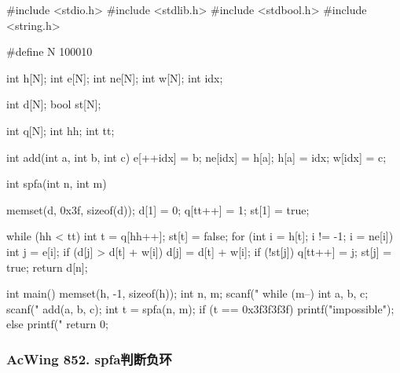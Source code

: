 \begin{mycpptwocol}[SPFA]
    #include <stdio.h>
    #include <stdlib.h>
    #include <stdbool.h>
    #include <string.h>

    #define N 100010

    int h[N];
    int e[N];
    int ne[N];
    int w[N];
    int idx;

    int d[N];
    bool st[N];

    int q[N];
    int hh;
    int tt;

    int add(int a, int b, int c) {
        e[++idx] = b;
        ne[idx] = h[a];
        h[a] = idx;
        w[idx] = c;
    }

    int spfa(int n, int m) {
        memset(d, 0x3f, sizeof(d));
        d[1] = 0;
        q[tt++] = 1;
        st[1] = true;

        while (hh < tt) {
            int t = q[hh++];
            st[t] = false;
            for (int i = h[t]; i != -1; i = ne[i]) {
                int j = e[i];
                if (d[j] > d[t] + w[i]) {
                    d[j] = d[t] + w[i];
                    if (!st[j]) {
                        q[tt++] = j;
                        st[j] = true;
                    }
                }
            }
        }
        return d[n];
    }

    int main() {
        memset(h, -1, sizeof(h));
        int n, m;
        scanf("%
        while (m--) {
            int a, b, c;
            scanf("%
            add(a, b, c);
        }
        int t = spfa(n, m);
        if (t == 0x3f3f3f3f) {
            printf("impossible");
        } else {
            printf("%
        }
        return 0;
    }
\end{mycpptwocol}

\subsubsection{AcWing 852. spfa判断负环}

